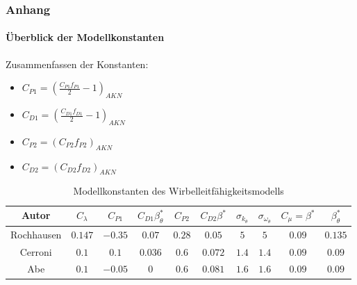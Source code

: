 \documentclass[10pt,xcolor=dvipsnames]{beamer}
\begin{document}
\begin{frame}
    \frametitle{Anhang}
    \framesubtitle{Überblick der Modellkonstanten}
    Zusammenfassen der Konstanten: \\
    \begin{itemize}
        \item $C_{P1} = \left( \frac{C_{P1} f_{P1}}{2}  - 1 \right)_{AKN}$
        \item $C_{D1} = \left( \frac{C_{D1} f_{D1}}{2}  - 1 \right)_{AKN}$
        \item $C_{P2} = \left( C_{P2} f_{P2} \right)_{AKN}$
        \item $C_{D2} = \left( C_{D2} f_{D2} \right)_{AKN}$
    \end{itemize}
    \vspace{1cm}
    \begin{scriptsize}
        \begin{table}
            \centering
            \begin{tabular}{|c|c|c|c|c|c|c|c|c|c|}
                \hline
                Autor & $C_\lambda$ & $C_{P1}$ & $C_{D1}\beta_\theta^*$ & $C_{P2}$ & $C_{D2}\beta^*$ & $\sigma_{k_\theta}$ & $\sigma_{\omega_\theta}$  & $C_\mu=\beta^*$ & $\beta_\theta^*$ \\ 
                \hline  \hline 
                Rochhausen & $0.147$ & $-0.35$ & $0.07$ & $0.28$ & $0.05$ & $5$ & $5$ & $0.09$ & $0.135$ \\ 
                \hline 
                Cerroni & $0.1$ & $0.1$ & $0.036$ & $0.6$ & $0.072$ & $1.4$ & $1.4$ & $0.09$ & $0.09$ \\ 
                \hline 
                Abe & $0.1$ & $-0.05$ & $0$ & $0.6$ & $0.081$ & $1.6$ & $1.6$ & $0.09$ & $0.09$ \\ 
                \hline 
            \end{tabular}
            \caption{Modellkonstanten des Wirbelleitfähigkeitsmodells}
        \end{table}
    \end{scriptsize}
\end{frame}
\end{document}
